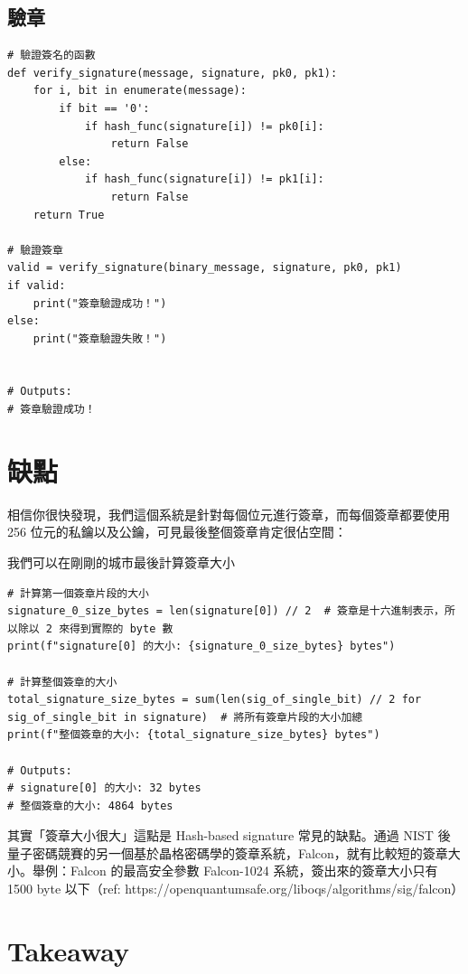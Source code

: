 \documentclass[
]{article}
\begin{document}
\hypertarget{ux9a57ux7ae0-1}{%
\subsection{驗章}\label{ux9a57ux7ae0-1}}

\begin{verbatim}
# 驗證簽名的函數
def verify_signature(message, signature, pk0, pk1):
    for i, bit in enumerate(message):
        if bit == '0':
            if hash_func(signature[i]) != pk0[i]:
                return False
        else:
            if hash_func(signature[i]) != pk1[i]:
                return False
    return True
    
# 驗證簽章
valid = verify_signature(binary_message, signature, pk0, pk1)
if valid:
    print("簽章驗證成功！")
else:
    print("簽章驗證失敗！")


# Outputs:
# 簽章驗證成功！
\end{verbatim}

\hypertarget{ux7f3aux9ede}{%
\section{缺點}\label{ux7f3aux9ede}}

相信你很快發現，我們這個系統是針對每個位元進行簽章，而每個簽章都要使用
256 位元的私鑰以及公鑰，可見最後整個簽章肯定很佔空間：

我們可以在剛剛的城市最後計算簽章大小

\begin{verbatim}
# 計算第一個簽章片段的大小
signature_0_size_bytes = len(signature[0]) // 2  # 簽章是十六進制表示，所以除以 2 來得到實際的 byte 數
print(f"signature[0] 的大小: {signature_0_size_bytes} bytes")

# 計算整個簽章的大小
total_signature_size_bytes = sum(len(sig_of_single_bit) // 2 for sig_of_single_bit in signature)  # 將所有簽章片段的大小加總
print(f"整個簽章的大小: {total_signature_size_bytes} bytes")

# Outputs:
# signature[0] 的大小: 32 bytes
# 整個簽章的大小: 4864 bytes
\end{verbatim}

其實「簽章大小很大」這點是 Hash-based signature 常見的缺點。通過 NIST
後量子密碼競賽的另一個基於晶格密碼學的簽章系統，Falcon，就有比較短的簽章大小。舉例：Falcon
的最高安全參數 Falcon-1024 系統，簽出來的簽章大小只有 1500 byte
以下（ref: https://openquantumsafe.org/liboqs/algorithms/sig/falcon）

\hypertarget{takeaway}{%
\section{Takeaway}\label{takeaway}}
\end{document}
